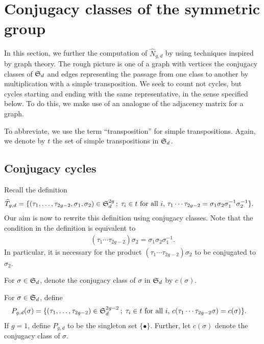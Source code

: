 \section{Conjugacy classes of the symmetric group}

In this section, we further the computation of $\widehat{N}_{g,d}$ by using techniques inspired by graph theory. The rough picture is one of a graph with vertices the conjugacy classes of $\operatorname{\mathfrak{S}}_d$ and edges representing the passage from one class to another by multiplication with a simple transposition. We seek to count not cycles, but cycles starting and ending with the same representative, in the sense specified below. To do this, we make use of an analogue of the adjacency matrix for a graph.

To abbreviate, we use the term ``transposition'' for simple transpositions. Again, we denote by $t$ the set of simple transpositions in $\operatorname{\mathfrak{S}}_d$.

\subsection{Conjugacy cycles}

Recall the definition
\begin{align*}
  \widehat{T}_{g,d} = \{(\tau_1,\dotsc,\tau_{2g-2},\sigma_1,\sigma_2)\in \operatorname{\mathfrak{S}}_d^{2g} \,;\; \tau_i\in t \text{ for all $i$, } &\tau_1\dotsm\tau_{2g-2}=\sigma_1\sigma_2\sigma_1^{-1}\sigma_2^{-1}\}.
 \end{align*}
Our aim is now to rewrite this definition using conjugacy classes. Note that the condition in the definition is equivalent to
\begin{align*} \label{eq:conj-cond}
 (\tau_1 \dotsm \tau_{2g-2})\sigma_2=\sigma_1\sigma_2\sigma_1^{-1}.
\end{align*}
In particular, it is necessary for the product $(\tau_1 \dotsm \tau_{2g-2})\sigma_2$ to be conjugated to $\sigma_2$.

For $\sigma\in\operatorname{\mathfrak{S}}_d$, denote the conjugacy class of $\sigma$ in $\operatorname{\mathfrak{S}}_d$ by $c(\sigma)$.
\begin{defi}
 For $\sigma \in \operatorname{\mathfrak{S}}_d$, define
 \begin{align*}
  P_{g,d}(\sigma) = \{(\tau_1,\dotsc,\tau_{2g-2})\in \operatorname{\mathfrak{S}}_d^{2g-2} \,;\; \tau_i\in t \text{ for all $i$, } &c(\tau_1\dotsm\tau_{2g-2}\sigma)=c(\sigma)\}.
 \end{align*}
 If $g=1$, define $P_{g,d}$ to be the singleton set $\{\bullet\}$.
 Further, let $c(\sigma)$ denote the conjugacy class of $\sigma$.
\end{defi}

